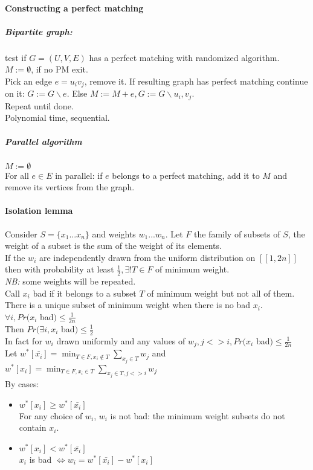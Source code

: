 \documentclass[12pt]{article}
\begin{document}
\paragraph{Constructing a perfect matching\\}

\subparagraph{Bipartite graph:} test if $G=(U,V,E)$ has a perfect matching with randomized algorithm.\\
$M := \emptyset$, if no PM exit.\\
Pick an edge $e = u_i v_j$, remove it. If resulting graph has perfect matching continue on it: $G := G \backslash e$. Else $M := M+e, G := G \backslash u_i, v_j$.\\
Repeat until done.\\
Polynomial time, sequential.\\

\subparagraph{Parallel algorithm\\}
$M := \emptyset$\\
For all $e \in E$ in parallel: if $e$ belongs to a perfect matching, add it to $M$ and remove its vertices from the graph.\\

\paragraph{Isolation lemma\\}
Consider $S = \{x_1 ... x_n\}$ and weights $w_1 ... w_n$. Let $F$ the family of subsets of $S$, the weight of a subset is the sum of the weight of its elements.\\
If the $w_i$ are independently drawn from the uniform distribution on $[[1, 2n]]$ then with probability at least $\frac{1}{2}, \exists! T \in F$ of minimum weight.\\
\emph{NB:} some weights will be repeated.\\
Call $x_i$ bad if it belongs to a subset $T$ of minimum weight but not all of them. There is a unique subset of minimum weight when there is no bad $x_i$.\\
$\forall i, Pr(x_i$ bad$) \leqslant \frac{1}{2n}$\\
Then $Pr(\exists i, x_i$ bad$) \leqslant \frac{1}{2}$\\
In fact for $w_i$ drawn uniformly and any values of $w_j, j<>i, Pr(x_i$ bad$) \leqslant \frac{1}{2n}$\\
Let $w^*[\bar{x_i}] = \min_{T \in F, x_i \notin T} \sum_{x_j \in T} w_j$ and\\
$w^*[x_i] = \min_{T \in F, x_i \in T} \sum_{x_j \in T, j<>i} w_j$\\
By cases:
\begin{itemize}
\item $w^*[x_i] \geqslant w^*[\bar{x_i}]$\\
	For any choice of $w_i$, $w_i$ is not bad: the minimum weight subsets do not contain $x_i$.
\item $w^*[x_i] < w^*[\bar{x_i}]$\\
	$x_i$ is bad $\Leftrightarrow w_i = w^*[\bar{x_i}] - w^*[x_i]$\\
\end{itemize}
\end{document}
